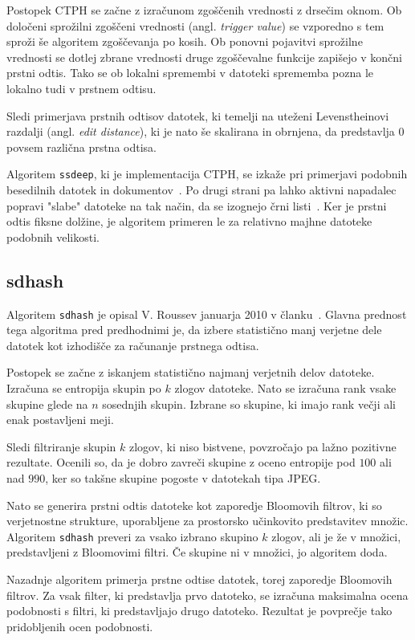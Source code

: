 \documentclass{acm_proc_article-sp}
\begin{document}
Postopek CTPH se začne z izračunom zgoščenih vrednosti z drsečim oknom. Ob določeni sprožilni zgoščeni vrednosti (angl. \emph{trigger value}) se vzporedno s tem sproži še algoritem zgoščevanja po kosih. Ob ponovni pojavitvi sprožilne vrednosti se dotlej zbrane vrednosti druge zgoščevalne funkcije zapišejo v končni prstni odtis.
Tako se ob lokalni spremembi v datoteki sprememba pozna le lokalno tudi v prstnem odtisu.

Sledi primerjava prstnih odtisov datotek, ki temelji na uteženi Levenstheinovi razdalji (angl. \emph{edit distance}), ki je nato še skalirana in obrnjena, da predstavlja $0$ povsem različna prstna odtisa.

Algoritem \texttt{ssdeep}, ki je implementacija CTPH, se izkaže pri primerjavi podobnih besedilnih datotek in dokumentov~\cite{kornblum:ctph}. Po drugi strani pa lahko aktivni napadalec popravi "slabe" datoteke na tak način, da se izognejo črni listi~\cite{fbhash}. Ker je prstni odtis fiksne dolžine, je algoritem primeren le za relativno majhne datoteke podobnih velikosti.

\subsection{sdhash}
Algoritem \texttt{sdhash} je opisal V. Roussev januarja 2010 v članku~\cite{roussev:sdhash}. Glavna prednost tega algoritma pred predhodnimi je, da izbere statistično manj verjetne dele datotek kot izhodišče za računanje prstnega odtisa.

Postopek se začne z iskanjem statistično najmanj verjetnih delov datoteke. Izračuna se entropija skupin po $k$ zlogov datoteke. Nato se izračuna rank vsake skupine glede na $n$ sosednjih skupin. Izbrane so skupine, ki imajo rank večji ali enak postavljeni meji.

Sledi filtriranje skupin $k$ zlogov, ki niso bistvene, povzročajo pa lažno pozitivne rezultate. Ocenili so, da je dobro zavreči skupine z oceno entropije pod $100$ ali nad $990$, ker so takšne skupine pogoste v datotekah tipa JPEG.

Nato se generira prstni odtis datoteke kot zaporedje Bloomovih filtrov, ki so verjetnostne strukture, uporabljene za prostorsko učinkovito predstavitev množic. Algoritem \texttt{sdhash} preveri za vsako izbrano skupino $k$ zlogov, ali je že v množici, predstavljeni z Bloomovimi filtri. Če skupine ni v množici, jo algoritem doda.

Nazadnje algoritem primerja prstne odtise datotek, torej zaporedje Bloomovih filtrov. Za vsak filter, ki predstavlja prvo datoteko, se izračuna maksimalna ocena podobnosti s filtri, ki predstavljajo drugo datoteko. Rezultat je povprečje tako pridobljenih ocen podobnosti.
\end{document}
